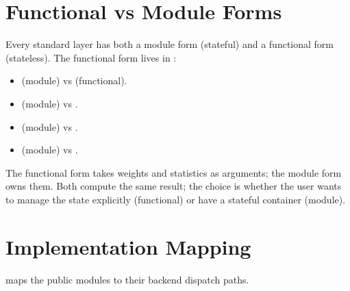 \section{Functional vs Module Forms}
\label{sec:linear_conv_norm:functional_vs_module}

Every standard layer has both a module form (stateful) and a
functional form (stateless). The functional form lives in
:

\begin{itemize}
  \item {} (module) vs 
    (functional).
  \item {} (module) vs .
  \item {} (module) vs .
  \item {} (module) vs
    .
\end{itemize}

The functional form takes weights and statistics as arguments;
the module form owns them. Both compute the same result; the
choice is whether the user wants to manage the state explicitly
(functional) or have a stateful container (module).

\section{Implementation Mapping}
\label{sec:linear_conv_norm:impl_mapping}

 maps the public modules to
their backend dispatch paths.

